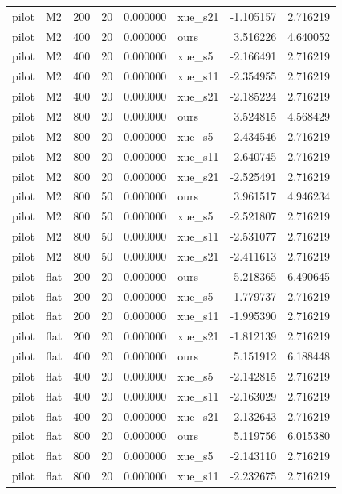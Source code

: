 \begin{longtable}{llrrrlrr}
pilot & M2 & 200 & 20 & 0.000000 & xue\_s21 & -1.105157 & 2.716219 \\
pilot & M2 & 400 & 20 & 0.000000 & ours & 3.516226 & 4.640052 \\
pilot & M2 & 400 & 20 & 0.000000 & xue\_s5 & -2.166491 & 2.716219 \\
pilot & M2 & 400 & 20 & 0.000000 & xue\_s11 & -2.354955 & 2.716219 \\
pilot & M2 & 400 & 20 & 0.000000 & xue\_s21 & -2.185224 & 2.716219 \\
pilot & M2 & 800 & 20 & 0.000000 & ours & 3.524815 & 4.568429 \\
pilot & M2 & 800 & 20 & 0.000000 & xue\_s5 & -2.434546 & 2.716219 \\
pilot & M2 & 800 & 20 & 0.000000 & xue\_s11 & -2.640745 & 2.716219 \\
pilot & M2 & 800 & 20 & 0.000000 & xue\_s21 & -2.525491 & 2.716219 \\
pilot & M2 & 800 & 50 & 0.000000 & ours & 3.961517 & 4.946234 \\
pilot & M2 & 800 & 50 & 0.000000 & xue\_s5 & -2.521807 & 2.716219 \\
pilot & M2 & 800 & 50 & 0.000000 & xue\_s11 & -2.531077 & 2.716219 \\
pilot & M2 & 800 & 50 & 0.000000 & xue\_s21 & -2.411613 & 2.716219 \\
pilot & flat & 200 & 20 & 0.000000 & ours & 5.218365 & 6.490645 \\
pilot & flat & 200 & 20 & 0.000000 & xue\_s5 & -1.779737 & 2.716219 \\
pilot & flat & 200 & 20 & 0.000000 & xue\_s11 & -1.995390 & 2.716219 \\
pilot & flat & 200 & 20 & 0.000000 & xue\_s21 & -1.812139 & 2.716219 \\
pilot & flat & 400 & 20 & 0.000000 & ours & 5.151912 & 6.188448 \\
pilot & flat & 400 & 20 & 0.000000 & xue\_s5 & -2.142815 & 2.716219 \\
pilot & flat & 400 & 20 & 0.000000 & xue\_s11 & -2.163029 & 2.716219 \\
pilot & flat & 400 & 20 & 0.000000 & xue\_s21 & -2.132643 & 2.716219 \\
pilot & flat & 800 & 20 & 0.000000 & ours & 5.119756 & 6.015380 \\
pilot & flat & 800 & 20 & 0.000000 & xue\_s5 & -2.143110 & 2.716219 \\
pilot & flat & 800 & 20 & 0.000000 & xue\_s11 & -2.232675 & 2.716219 \\

\end{longtable}
